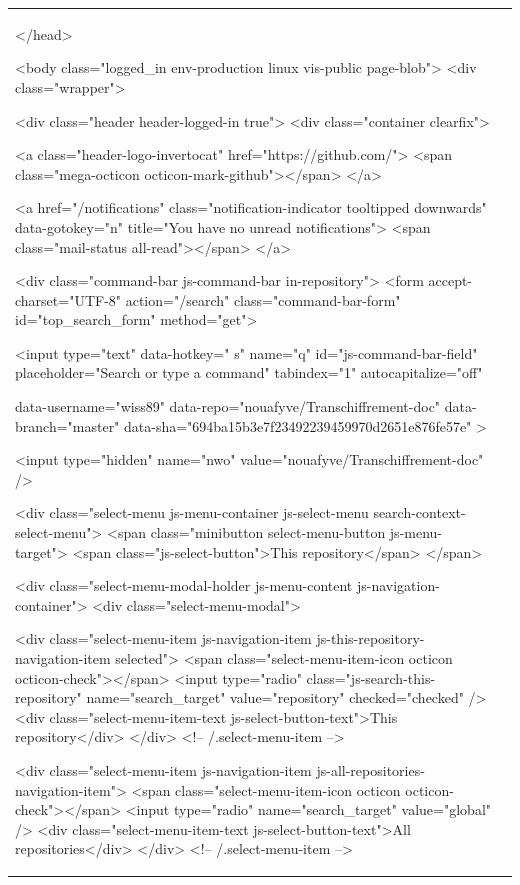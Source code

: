 \documentclass[a4paper,11pt,french]{article}
\begin{document}
\begin{tabular}{|m{8cm}|m{8cm}|}
  </head>


  <body class="logged_in  env-production linux vis-public page-blob">
    <div class="wrapper">
      
      
      
      


      <div class="header header-logged-in true">
  <div class="container clearfix">

    <a class="header-logo-invertocat" href="https://github.com/">
  <span class="mega-octicon octicon-mark-github"></span>
</a>

    
    <a href="/notifications" class="notification-indicator tooltipped downwards" data-gotokey="n" title="You have no unread notifications">
        <span class="mail-status all-read"></span>
</a>

      <div class="command-bar js-command-bar  in-repository">
          <form accept-charset="UTF-8" action="/search" class="command-bar-form" id="top_search_form" method="get">

<input type="text" data-hotkey=" s" name="q" id="js-command-bar-field" placeholder="Search or type a command" tabindex="1" autocapitalize="off"
    
    data-username="wiss89"
      data-repo="nouafyve/Transchiffrement-doc"
      data-branch="master"
      data-sha="694ba15b3e7f23492239459970d2651e876fe57e"
  >

    <input type="hidden" name="nwo" value="nouafyve/Transchiffrement-doc" />

    <div class="select-menu js-menu-container js-select-menu search-context-select-menu">
      <span class="minibutton select-menu-button js-menu-target">
        <span class="js-select-button">This repository</span>
      </span>

      <div class="select-menu-modal-holder js-menu-content js-navigation-container">
        <div class="select-menu-modal">

          <div class="select-menu-item js-navigation-item js-this-repository-navigation-item selected">
            <span class="select-menu-item-icon octicon octicon-check"></span>
            <input type="radio" class="js-search-this-repository" name="search_target" value="repository" checked="checked" />
            <div class="select-menu-item-text js-select-button-text">This repository</div>
          </div> <!-- /.select-menu-item -->

          <div class="select-menu-item js-navigation-item js-all-repositories-navigation-item">
            <span class="select-menu-item-icon octicon octicon-check"></span>
            <input type="radio" name="search_target" value="global" />
            <div class="select-menu-item-text js-select-button-text">All repositories</div>
          </div> <!-- /.select-menu-item -->


\end{tabular}
\end{document}
